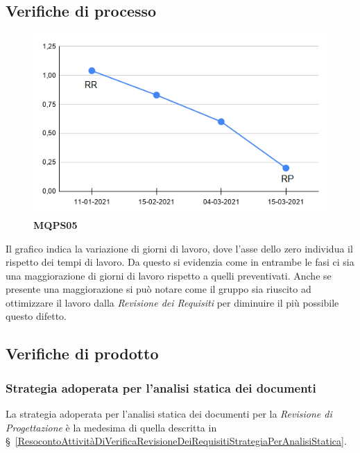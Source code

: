 {{\subsection{Verifiche di processo} \label{RevisioneDiProgettazioneVerificheDiProcesso}
\begin{center}
 \begin{figure}[H]
	 \includegraphics[width=1\linewidth]{../immagini/Metriche/MQPS05.png}
	 \caption{\textbf{MQPS05}}
 \end{figure}
\end{center}
Il grafico indica la variazione di giorni di lavoro, dove l'asse dello zero individua il rispetto dei tempi di lavoro. Da questo si evidenzia come in entrambe le fasi ci sia una maggiorazione di giorni di lavoro rispetto a quelli preventivati. Anche se presente una maggiorazione si può notare come il gruppo sia riuscito ad ottimizzare il lavoro dalla \textit{Revisione dei Requisiti} per diminuire il più possibile questo difetto.
 \subsection{Verifiche di prodotto} \label{ResocontoAttivitàDiVerificaRevisioneDiProgettazioneVerificheDiProdotto}
\subsubsection{Strategia adoperata per l’analisi statica dei documenti} \label{ResocontoAttivitàDiVerificaRevisioneDiProgettazioneVerificheDiProdottoStrategiaPerAnalisiStatica}
La strategia adoperata per l’analisi statica dei documenti per la \textit{Revisione di Progettazione} è la medesima di quella descritta in \S~\ref{ResocontoAttivitàDiVerificaRevisioneDeiRequisitiStrategiaPerAnalisiStatica}.
}}
